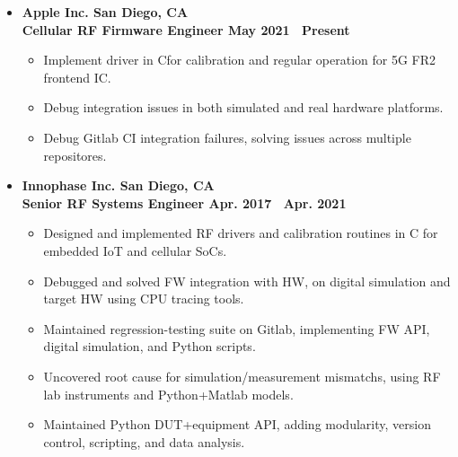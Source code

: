 \documentclass[10pt, letterpaper]{letter}
\def\myplus{\hspace{-.3em}\raisebox{.4ex}{ \tiny +}}
\def\cpp{C\myplus\myplus}
\begin{document}
\begin{itemize}[label=$\bullet$, leftmargin=1em]

    \item
    \textbf{Apple Inc. \hfill San Diego, CA}\vspace{2pt}\\
    \textbf{Cellular RF Firmware Engineer \hfill May 2021 \textendash\ Present}\vspace{2pt}
    \begin{itemize}[nosep, leftmargin=1.15em]
        \item Implement driver in \cpp for calibration and regular operation for 5G FR2 frontend IC.  
        \item Debug integration issues in both simulated and real hardware platforms.
        \item Debug Gitlab CI integration failures, solving issues across multiple repositores.
    \end{itemize}

\vfill

    \item
    \textbf{Innophase Inc. \hfill San Diego, CA}\vspace{2pt}\\
    \textbf{Senior RF Systems Engineer \hfill Apr. 2017 \textendash\ Apr. 2021}\vspace{2pt}
    \begin{itemize}[nosep, leftmargin=1.15em]
        \item Designed and implemented RF drivers and calibration routines in C for embedded IoT and cellular SoCs.
        \item Debugged and solved FW integration with HW, on digital simulation and target HW using CPU tracing tools.
        \item Maintained regression-testing suite on Gitlab, implementing FW API, digital simulation, and Python scripts.
        \item Uncovered root cause for simulation/measurement mismatchs, using RF lab instruments and Python+Matlab models.
        \item Maintained Python DUT+equipment API, adding modularity, version control, scripting, and data analysis.
    \end{itemize}


\end{itemize}
\end{document}
